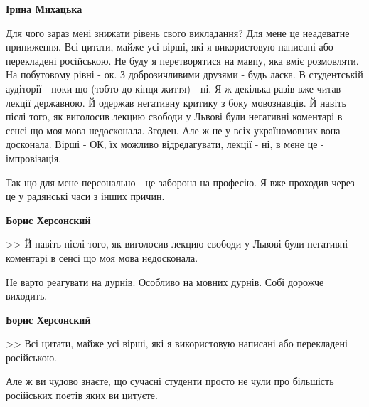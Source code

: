 \begin{itemize}
\begin{itemize}
 
\textbf{Ірина Михацька} 

Для чого зараз мені знижати рівень свого викладання? Для мене це неадеватне
приниження. Всі цитати, майже усі вірші, які я використовую написані або
перекладені російською. Не буду я перетворятися на мавпу, яка вміє розмовляти.
На побутовому рівні - ок. З доброзичливими друзями - будь ласка. В студентській
аудіторії - поки що (тобто до кінця життя) - ні. Я ж декілька разів вже читав
лекції державною. Й одержав негативну критику з боку мовознавців. Й навіть
післі того, як виголосив лекцию свободи у Львові були негативні коментарі в
сенсі що моя мова недосконала. Згоден. Але ж не у всіх україномовних вона
досконала. Вірші - ОК, їх можливо відредагувати, лекції - ні, в мене це -
імпровізація.

 

Так що для мене персонально - це заборона на професію. Я вже проходив через це
у радянські часи з інших причин.

 
\textbf{Борис Херсонский} 

>> Й навіть післі того, як виголосив лекцию свободи у Львові були негативні
коментарі в сенсі що моя мова недосконала.

Не варто реагувати на дурнів. Особливо на мовних дурнів. Собі дорожче виходить.


 
\textbf{Борис Херсонский} 

>> Всі цитати, майже усі вірші, які я використовую написані або перекладені
російською.

Але ж ви чудово знаєте, що сучасні студенти просто не чули про більшість
російських поетів яких ви цитуєте.


\end{itemize}
\end{itemize}
